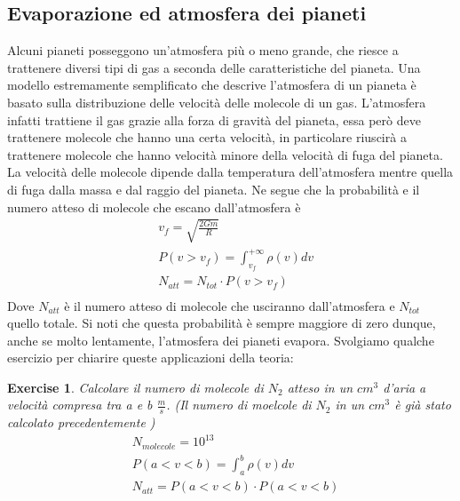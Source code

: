 \documentclass[10pt,a4paper]{article}
\newtheorem{exercise}{Exercise}
\begin{document}
\subsection{Evaporazione ed atmosfera dei pianeti}
Alcuni pianeti posseggono un'atmosfera più o meno grande, che riesce a trattenere diversi tipi di gas a seconda delle caratteristiche del pianeta. Una modello estremamente semplificato che descrive l'atmosfera di un pianeta è basato sulla distribuzione delle velocità delle molecole di un gas. L'atmosfera infatti trattiene il gas grazie alla forza di gravità del pianeta, essa però deve trattenere molecole che hanno una certa velocità, in particolare riuscirà a trattenere molecole che hanno velocità minore della velocità di fuga del pianeta. La velocità delle molecole dipende dalla temperatura dell'atmosfera mentre quella di fuga dalla massa e dal raggio del pianeta. Ne segue che la probabilità e il numero atteso di molecole che escano dall'atmosfera è
\begin{align*} 
	&v_f = \sqrt{\frac{2 G m}{R}}\\
	&P(v > v_f) = \int_{v_f}^{+\infty}\rho(v)dv\\
	&N_{att} = N_{tot} \cdot P(v > v_f)\\
\end{align*} 
Dove $N_{att}$ è il numero atteso di molecole che usciranno dall'atmosfera e $N_{tot}$ quello totale. Si noti che questa probabilità è sempre maggiore di zero dunque, anche se molto lentamente, l'atmosfera dei pianeti evapora. Svolgiamo qualche esercizio per chiarire queste applicazioni della teoria:
\begin{exercise}
	Calcolare il numero di molecole di $N_2$ atteso in un $cm^3$ d'aria a velocità compresa tra a e b $\frac{m}{s}$. (Il numero di moelcole di $N_2$ in un $cm^3$ è già stato calcolato precedentemente )
	\begin{align*} 
		&N_{molecole} = 10^{13}\\
		&P(a<v<b) = \int_{a}^{b}\rho(v)dv\\
		&N_{att}=P(a<v<b)\cdot P(a<v<b) 
	\end{align*} 
\end{exercise}
\end{document}
